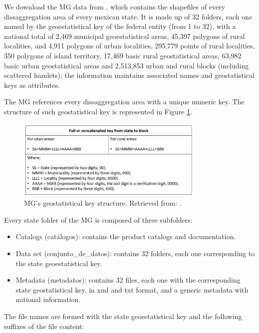 We download the MG data from \cite{MG_data}, which contains the shapefiles of every dissaggregation area of every mexican state. It is made up of 32 folders, each one named by the geoestatistical key of the federal entity (from 1 to 32), with a national total of 2,469 municipal geoestatistical areas, 45,397 polygons of rural localities, and 4,911 polygons of urban localities, 295,779 points of rural localities, 350 polygons of island territory, 17,469 basic rural geostatistical areas, 63,982 basic urban geostatistical areas and 2,513,853 urban and rural blocks (including scattered hamlets); the information maintains associated names and geostatistical keys as attributes.

The MG references every dissaggregation area with a unique numeric key. The structure of such geostatistical key is represented in Figure \ref{fig:key_structure}.

\begin{figure}[h!]
	\centering
	\includegraphics[width=0.8\textwidth]{Figures/key_structure.jpg}
	\caption{MG's geostatistical key structure. Retrieved from: \cite{manualMGN}.
		\label{fig:key_structure}}
\end{figure}


Every state folder of the MG is composed of three subfolders:

\begin{itemize}
	\item Catalogs (catálogos): contains the product catalogs and documentation.
	\item Data set (conjunto\_de\_datos): contains 32 folders, each one corresponding to the state geoestatistical key.
	\item Metadata (metadatos): contains 32 files, each one with the corresponding state geostatistical key, in xml and txt format, and a generic metadata with national information.
\end{itemize}

The file names are formed with the state geoestatistical key and the following suffixes of the file content: 

